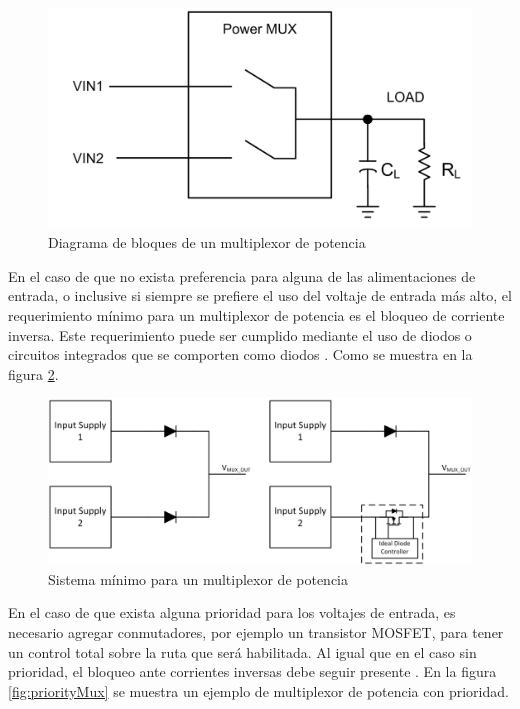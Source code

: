 \begin{figure}[H]
    \centering
    \includegraphics[scale=.35]{imagenes/powerMux.png}
    \caption{Diagrama de bloques de un multiplexor de potencia \cite{triano_basics_2020}}
    \label{fig:powerMux}
\end{figure}


En el caso de que no exista preferencia para alguna de las alimentaciones de entrada, o inclusive
si siempre se prefiere el uso del voltaje de entrada más alto, el requerimiento mínimo para un multiplexor
de potencia es el bloqueo de corriente inversa. Este requerimiento puede ser cumplido mediante el uso de 
diodos o circuitos integrados que se comporten como diodos \cite{triano_basics_2020}.  Como se muestra en la figura \ref{fig:muxDiode}.

\begin{figure}[H]
    \centering
    \includegraphics[scale=.35]{imagenes/minimumMux.png}
    \caption{Sistema mínimo para un multiplexor de potencia \cite{triano_basics_2020}}
    \label{fig:muxDiode}
\end{figure}

En el caso de que exista alguna prioridad para los voltajes de entrada, es necesario agregar conmutadores,
por ejemplo un transistor MOSFET, para tener un control total sobre la ruta que será habilitada. Al igual que
en el caso sin prioridad, el bloqueo ante corrientes inversas debe seguir presente \cite{triano_basics_2020}. En la figura \ref{fig:priorityMux} se muestra un ejemplo de multiplexor de potencia con prioridad.

